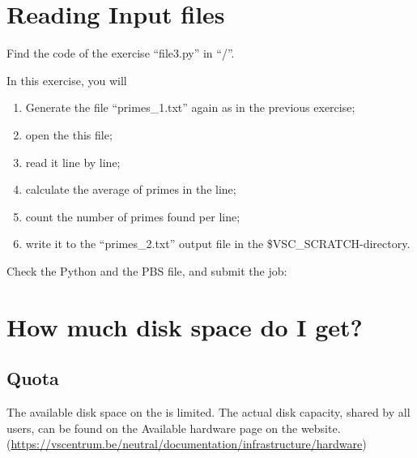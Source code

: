\begin{prompt}
\end{prompt}

\section{Reading Input files}

\begin{tip}
Find the code of the exercise ``file3.py'' in
``\tilde/\exampledir''.
\end{tip}

In this exercise, you will
\begin{enumerate}
\item  Generate the file ``primes\_1.txt'' again as in the previous exercise; 
\item  open the this file; 
\item  read it line by line; 
\item  calculate the average of primes in the line; 
\item  count the number of primes found per line; 
\item  write it to the ``primes\_2.txt'' output file in the \$VSC\_SCRATCH-directory.
\end{enumerate}

Check the Python and the PBS file, and submit the job:

\begin{prompt}
\end{prompt}

\section{How much disk space do I get?}
\label{sect:how-much-disk-space-do-i-get}

\subsection{Quota}

The available disk space on the \hpc is limited. The actual disk capacity,
shared by all users, can be found on the Available hardware page on the
website.
(\url{https://vscentrum.be/neutral/documentation/infrastructure/hardware})

